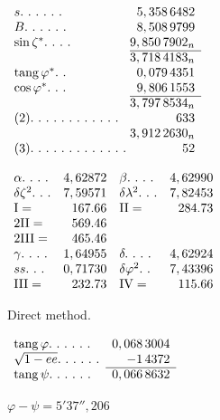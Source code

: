 \begin{minipage}[t]{.317\linewidth}\vspace{0pt}\centering
\(\begin{array}{l@{\;}r}
s\ldotp\,\ldotp\,\ldotp\,\ldotp\,\ldotp\,\ldotp&5,358\,6482\\
B\ldotp\,\ldotp\,\ldotp\,\ldotp\,\ldotp\,\ldotp&8,508\,9799\\
\sin\zeta^*\ldotp\,\ldotp\,\ldotp\,\ldotp&9,850\,7902_n\\\cline{2-2}
&3,718\,4183_n\\
\operatorname{tang}\varphi^*\ldotp\,\ldotp&0,079\,4351\\
\cos\varphi^*\ldotp\,\ldotp\,\ldotp&9,806\,1553\\\cline{2-2}
&3,797\,8534_n\\
(2)\ldotp\,\ldotp\,\ldotp\,\ldotp\,\ldotp\,\ldotp\,\ldotp\,\ldotp\,\ldotp\,\ldotp\,\ldotp\,\ldotp&633\\
&3,912\,2630_n\\
(3)\ldotp\,\ldotp\,\ldotp\,\ldotp\,\ldotp\,\ldotp\,\ldotp\,\ldotp\,\ldotp\,\ldotp\,\ldotp\,\ldotp\,\ldotp&52
\end{array}\)
\end{minipage}\hfill
\begin{minipage}[t]{.387\linewidth}\vspace{0pt}\centering
\(\begin{array}{lr@{\quad}lr}
\alpha\ldotp\,\ldotp\,\ldotp\,\ldotp&4,62872&\beta\ldotp\,\ldotp\,\ldotp\,\ldotp&4,62990\\
\delta\zeta^2\ldotp\,\ldotp\,\ldotp&7,59571&\delta\lambda^2\ldotp\,\ldotp\,\ldotp&7,82453\\
\mathrm{I}=&167.66&\mathrm{II}=&284.73\\
2\mathrm{II}=&569.46&&\\
2\mathrm{III}=&465.46&&\\
\gamma\ldotp\,\ldotp\,\ldotp\,\ldotp&1,64955&\delta\ldotp\,\ldotp\,\ldotp\,\ldotp&4,62924\\
ss\ldotp\,\ldotp\,\ldotp&0,71730&\delta\varphi^2\ldotp\,\ldotp&7,43396\\
\mathrm{III}=&232.73&\mathrm{IV}=&115.66
\end{array}\)
\end{minipage}
\par{}\quad Direct method.
\par\medskip
\noindent\begin{minipage}[t]{.34\linewidth}\vspace{0pt}\centering
\(\begin{array}{lr}
\operatorname{tang}\varphi\ldotp\,\ldotp\,\ldotp\,\ldotp\,\ldotp\,\ldotp&0,068\,3004\\
\sqrt{1-ee}\ldotp\,\ldotp\,\ldotp\,\ldotp\,\ldotp\,\ldotp&-1\,4372\\\cline{2-2}
\operatorname{tang}\psi\ldotp\,\ldotp\,\ldotp\,\ldotp\,\ldotp\,\ldotp&0,066\,8632
\end{array}\)
\par\vspace{7ex}
\(\varphi-\psi=5'37'',206\)
\end{minipage}\hfill
